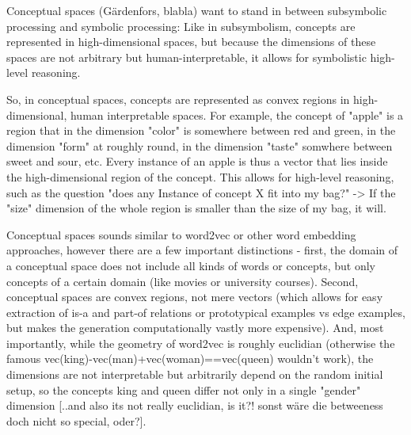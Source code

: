 Conceptual spaces (Gärdenfors, blabla) want to stand in between subsymbolic processing and symbolic processing: Like in subsymbolism, concepts are represented in high-dimensional spaces, but because the dimensions of these spaces are not arbitrary but human-interpretable, it allows for symbolistic high-level reasoning.

So, in conceptual spaces, concepts are represented as convex regions in high-dimensional, human interpretable spaces. For example, the concept of "apple" is a region that in the dimension "color" is somewhere between red and green, in the dimension "form" at roughly round, in the dimension "taste" somwhere between sweet and sour, etc. 
Every instance of an apple is thus a vector that lies inside the high-dimensional region of the concept. This allows for high-level reasoning, such as the question "does any Instance of concept X fit into my bag?" -> If the "size" dimension of the whole region is smaller than the size of my bag, it will.

Conceptual spaces sounds similar to word2vec or other word embedding approaches, however there are a few important distinctions - first, the domain of a conceptual space does not include all kinds of words or concepts, but only concepts of a certain domain (like movies or university courses). 
Second, conceptual spaces are convex regions, not mere vectors (which allows for easy extraction of is-a and part-of relations or prototypical examples vs edge examples, but makes the generation computationally vastly more expensive). And, most importantly, while the geometry of word2vec is roughly euclidian (otherwise the famous vec(king)-vec(man)+vec(woman)==vec(queen) wouldn't work), the dimensions are not interpretable but arbitrarily depend on the random initial setup, so the concepts king and queen differ not only in a single "gender" dimension [..and also its not really euclidian, is it?! sonst wäre die betweeness doch nicht so special, oder?].


